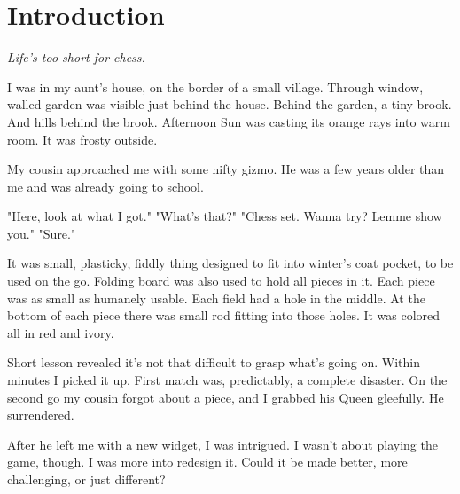 

\chapter*{Introduction}
\label{ch:Introduction}

\begin{flushright}
\parbox{0.6\textwidth}{
\emph{Life's too short for chess. \newline
{} } }
\end{flushright}

\noindent
I was in my aunt's house, on the border of a small village.
Through window, walled garden was visible just behind the house.
Behind the garden, a tiny brook. And hills behind the brook.
Afternoon Sun was casting its orange rays into warm room. It
was frosty outside.

My cousin approached me with some nifty gizmo. He was a
few years older than me and was already going to school.

\noindent
"Here, look at what I got." \newline
\hspace*{\fill}"What's that?" \newline
"Chess set. Wanna try? Lemme show you." \newline
\hspace*{\fill}"Sure."

It was small, plasticky, fiddly thing designed to fit into winter's
coat pocket, to be used on the go. Folding board was also used to
hold all pieces in it. Each piece was as small as humanely usable.
Each field had a hole in the middle. At the bottom of each piece
there was small rod fitting into those holes. It was colored all
in red and ivory.

Short lesson revealed it's not that difficult to grasp what's going
on. Within minutes I picked it up. First match was, predictably, a
complete disaster. On the second go my cousin forgot about a piece,
and I grabbed his Queen gleefully. He surrendered.

After he left me with a new widget, I was intrigued. I wasn't
about playing the game, though. I was more into redesign it. Could it
be made better, more challenging, or just different?

